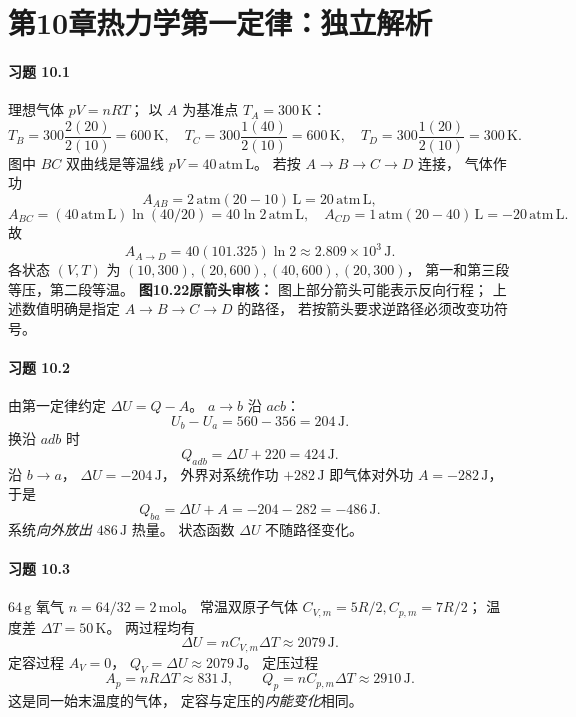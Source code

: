 \section*{第10章\quad 热力学第一定律：独立解析}

\paragraph{习题 10.1}
理想气体 \(pV=nRT\)；
以 \(A\) 为基准点 \(T_A=300\,\mathrm K\)：
\[
 \boxed{T_B=300\frac{2(20)}{2(10)}
 =600\,\mathrm K},\quad
 \boxed{T_C=300\frac{1(40)}{2(10)}
 =600\,\mathrm K},\quad
 \boxed{T_D=300\frac{1(20)}{2(10)}
 =300\,\mathrm K}.
\]
图中 \(BC\) 双曲线是等温线
\(pV=40\,\mathrm{atm\,L}\)。
若按 \(A\to B\to C\to D\) 连接，
气体作功
\[
 A_{AB}=2\,\mathrm{atm}(20-10)\,\mathrm L
 =20\,\mathrm{atm\,L},
\]
\[
 A_{BC}=(40\,\mathrm{atm\,L})\ln(40/20)
 =40\ln2\,\mathrm{atm\,L},
\quad
 A_{CD}=1\,\mathrm{atm}(20-40)\,\mathrm L
 =-20\,\mathrm{atm\,L}.
\]
故
\[
 \boxed{A_{A\to D}=40(101.325)\ln2
 \approx2.809\times10^3\,\mathrm J}.
\]
各状态 \((V,T)\) 为
\((10,300),(20,600),(40,600),(20,300)\)，
第一和第三段等压，第二段等温。
\textbf{图10.22原箭头审核：}
图上部分箭头可能表示反向行程；
上述数值明确是指定
\(A\to B\to C\to D\) 的路径，
若按箭头要求逆路径必须改变功符号。

\paragraph{习题 10.2}
由第一定律约定
\(\Delta U=Q-A\)。
\(a\to b\) 沿 \(acb\)：
\[
 \boxed{U_b-U_a=560-356=204\,\mathrm J}.
\]
换沿 \(adb\) 时
\[
 \boxed{Q_{adb}=\Delta U+220
 =424\,\mathrm J}.
\]
沿 \(b\to a\)，
\(\Delta U=-204\,\mathrm J\)，
外界对系统作功 \(+282\,\mathrm J\)
即气体对外功 \(A=-282\,\mathrm J\)，
于是
\[
 \boxed{Q_{ba}=\Delta U+A
 =-204-282=-486\,\mathrm J}.
\]
系统\emph{向外放出} \(486\,\mathrm J\) 热量。
状态函数 \(\Delta U\) 不随路径变化。

\paragraph{习题 10.3}
\(64\,\mathrm g\) 氧气
\(n=64/32=2\,\mathrm{mol}\)。
常温双原子气体
\(C_{V,m}=5R/2,C_{p,m}=7R/2\)；
温度差 \(\Delta T=50\,\mathrm K\)。
两过程均有
\[
 \boxed{\Delta U=nC_{V,m}\Delta T
 \approx2079\,\mathrm J}.
\]
定容过程 \(A_V=0\)，
\(\boxed{Q_V=\Delta U\approx2079\,\mathrm J}\)。
定压过程
\[
 \boxed{A_p=nR\Delta T\approx831\,\mathrm J},
 \qquad
 \boxed{Q_p=nC_{p,m}\Delta T\approx2910\,\mathrm J}.
\]
这是同一始末温度的气体，
定容与定压的\emph{内能变化}相同。

